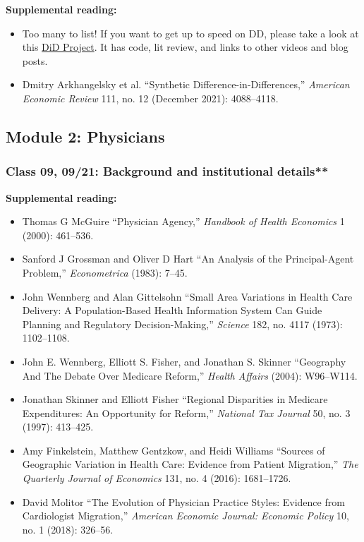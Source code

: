 \documentclass[11pt,]{article}
\providecommand{\tightlist}{%
  \setlength{\itemsep}{0pt}\setlength{\parskip}{0pt}}
\begin{document}
\textbf{Supplemental reading:}

\begin{itemize}
\tightlist
\item
  Too many to list! If you want to get up to speed on DD, please take a
  look at this
  \href{https://asjadnaqvi.github.io/DiD/docs/reading/04_literature/}{DiD
  Project}. It has code, lit review, and links to other videos and blog
  posts.
\item
  Dmitry Arkhangelsky et al. {``Synthetic
  {Difference}-in-{Differences},''} \emph{American Economic Review} 111,
  no. 12 (December 2021): 4088--4118.
\end{itemize}

\hypertarget{module-2-physicians}{%
\subsection{Module 2: Physicians}\label{module-2-physicians}}

\hypertarget{class-09-0921-background-and-institutional-details}{%
\subsubsection{Class 09, 09/21: Background and institutional
details**}\label{class-09-0921-background-and-institutional-details}}

\textbf{Supplemental reading:}

\begin{itemize}
\tightlist
\item
  Thomas G McGuire {``Physician Agency,''} \emph{Handbook of Health
  Economics} 1 (2000): 461--536.
\item
  Sanford J Grossman and Oliver D Hart {``An Analysis of the
  Principal-Agent Problem,''} \emph{Econometrica} (1983): 7--45.
\item
  John Wennberg and Alan Gittelsohn {``Small Area Variations in Health
  Care Delivery: A Population-Based Health Information System Can Guide
  Planning and Regulatory Decision-Making,''} \emph{Science} 182, no.
  4117 (1973): 1102--1108.
\item
  John E. Wennberg, Elliott S. Fisher, and Jonathan S. Skinner
  {``Geography {And} {The} {Debate} {Over} {Medicare} {Reform},''}
  \emph{Health Affairs} (2004): W96--W114.
\item
  Jonathan Skinner and Elliott Fisher {``Regional Disparities in
  {Medicare} Expenditures: An Opportunity for Reform,''} \emph{National
  Tax Journal} 50, no. 3 (1997): 413--425.
\item
  Amy Finkelstein, Matthew Gentzkow, and Heidi Williams {``Sources of
  Geographic Variation in Health Care: {Evidence} from Patient
  Migration,''} \emph{The Quarterly Journal of Economics} 131, no. 4
  (2016): 1681--1726.
\item
  David Molitor {``The Evolution of Physician Practice Styles: Evidence
  from Cardiologist Migration,''} \emph{American Economic Journal:
  Economic Policy} 10, no. 1 (2018): 326--56.
\end{itemize}
\end{document}
